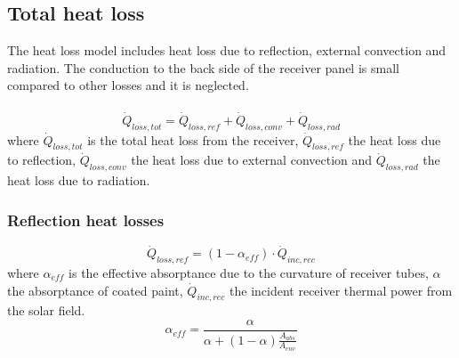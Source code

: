 \subsection{Total heat loss}
The heat loss model includes heat loss due to reflection, external convection and radiation. The conduction to the back side of the receiver panel is small compared to other losses and it is neglected.\\\\
\begin{equation}
\dot Q_{loss,tot} = \dot Q_{loss,ref}+ \dot Q_{loss,conv} + \dot Q_{loss,rad}
\end{equation}
where $\dot Q_{loss,tot}$ is the total heat loss from the receiver, $\dot Q_{loss,ref}$ the heat loss due to reflection, $\dot Q_{loss,conv}$ the heat loss due to external convection and $\dot Q_{loss,rad}$ the heat loss due to radiation.

\subsubsection{Reflection heat losses}
\begin{equation}
\dot Q_{loss,ref}=(1-\alpha_{eff})\cdot \dot Q_{inc,rec} 
\end{equation}
where $\alpha_{eff}$ is the effective absorptance due to the curvature of receiver tubes, $\alpha$ the absorptance of coated paint, $\dot Q_{inc,rec}$ the incident receiver thermal power from the solar field.
\begin{equation}
\alpha_{eff} = \frac {\alpha} {\alpha+(1-\alpha)\frac{A_{abs}}{A_{env}}}
\end{equation}
